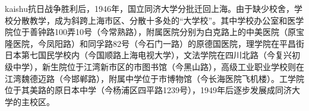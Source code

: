{\ifcsname kaishu\endcsname\kaishu\else[无 \cs{kaishu} 字体。]\fi 抗日战争胜利后，1946年，国立同济大学分批迁回上海。由于缺少校舍，学校分散教学，成为斜跨上海市区、分散十多处的“大学校”。其中学校办公室和医学院位于善钟路100弄10号（今常熟路），附属医院分别为白克路上的中美医院（原宝隆医院，今凤阳路）和同孚路82号（今石门一路）的原德国医院，理学院在平昌街日本第七国民学校内（今国顺路上海电视大学），文法学院在四川北路（今复兴初级中学），新生院位于江湾新市区的市图书馆（今黑山路），高级工业职业学校则在江湾魏德迈路（今邯郸路），附属中学位于市博物馆（今长海医院飞机楼）。工学院位于其美路的原日本中学（今杨浦区四平路1239号），1949年后逐步发展成同济大学的主校区。}


